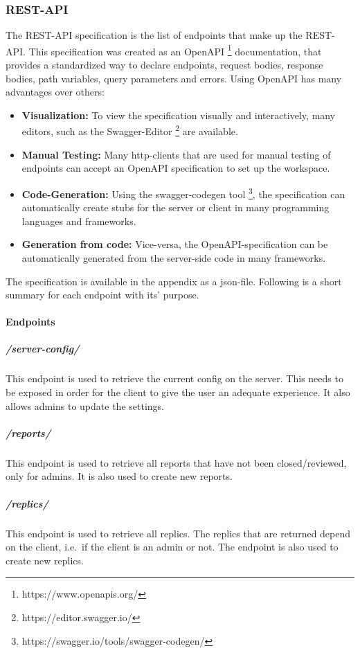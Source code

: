 \subsubsection{REST-API}
The REST-API specification is the list of endpoints that make up the REST-API\@.
This specification was created as an OpenAPI \footnote{https://www.openapis.org/} documentation, that provides a standardized way to declare endpoints, request bodies, response bodies, path variables, query parameters and errors.
Using OpenAPI has many advantages over others:
\begin{itemize}
    \item \textbf{Visualization:} To view the specification visually and interactively, many editors, such as the Swagger-Editor \footnote{https://editor.swagger.io/} are available.
    \item \textbf{Manual Testing:} Many http-clients that are used for manual testing of endpoints can accept an OpenAPI specification to set up the workspace.
    \item \textbf{Code-Generation:} Using the swagger-codegen tool \footnote{https://swagger.io/tools/swagger-codegen/}, the specification can automatically create stubs for the server or client in many programming languages and frameworks.
    \item \textbf{Generation from code:} Vice-versa, the OpenAPI-specification can be automatically generated from the server-side code in many frameworks.
\end{itemize}

The specification is available in the appendix as a json-file. \newline
Following is a short summary for each endpoint with its' purpose.

\paragraph{Endpoints}

\subparagraph{/server-config/} This endpoint is used to retrieve the current config on the server.
This needs to be exposed in order for the client to give the user an adequate experience.
It also allows admins to update the settings.

\subparagraph{/reports/} This endpoint is used to retrieve all reports that have not been closed/reviewed, only for admins.
It is also used to create new reports.

\subparagraph{/replics/} This endpoint is used to retrieve all replics.
The replics that are returned depend on the client, i.e.\ if the client is an admin or not.
The endpoint is also used to create new replics.

